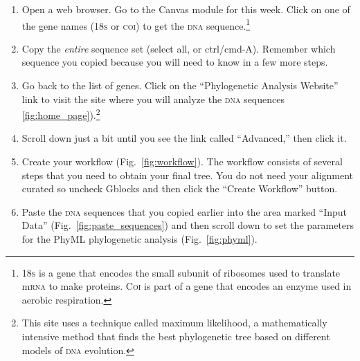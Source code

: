 \documentclass[12pt, hidelinks]{exam}
\newcommand{\dna}{\textsc{dna}}
\begin{document}
\begin{enumerate}

	\item Open a web browser. Go to the Canvas module for this week. Click on one of the gene names (18\textsc{s} or \textsc{coi}) to get the \textsc{dna} sequence.\footnote{18\textsc{s} is a gene that encodes the small subunit of ribosomes used to translate m\textsc{rna} to make proteins. C\textsc{oi} is part of a gene that encodes an enzyme used in aerobic respiration.}%
	
	
	\item Copy the \emph{entire} sequence set (select all, or ctrl/cmd-A). Remember which sequence you copied because you will need to know in a few more steps.
	

	\item Go back to the list of genes. Click on the “Phylogenetic Analysis Website” link to visit the site where you will analyze the \dna{} sequences \ref{fig:home_page}).\footnote{This site uses a technique called maximum likelihood, a mathematically intensive method that finds the best phylogenetic tree based on different models of \dna{} evolution.} 

  	\item Scroll down just a bit until you see the link called “Advanced,” then click it.

	\item Create your workflow (Fig.~\ref{fig:workflow}). The workflow consists of several steps
that you need to obtain your final tree. You do not need your alignment curated so uncheck Gblocks and
then click the “Create Workflow” button.

	\item Paste the \textsc{dna} sequences that you copied earlier into the area
marked “Input Data” (Fig.~\ref{fig:paste_sequences}) and then scroll down to set the
parameters for the PhyML phylogenetic analysis (Fig.~\ref{fig:phyml}).


\end{enumerate}
\end{document}
